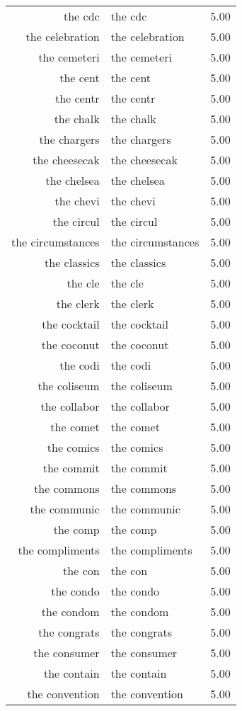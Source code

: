 \begin{table}[ht]
\begin{tabular}{rlr}
  the cdc & the cdc & 5.00 \\ 
  the celebration & the celebration & 5.00 \\ 
  the cemeteri & the cemeteri & 5.00 \\ 
  the cent & the cent & 5.00 \\ 
  the centr & the centr & 5.00 \\ 
  the chalk & the chalk & 5.00 \\ 
  the chargers & the chargers & 5.00 \\ 
  the cheesecak & the cheesecak & 5.00 \\ 
  the chelsea & the chelsea & 5.00 \\ 
  the chevi & the chevi & 5.00 \\ 
  the circul & the circul & 5.00 \\ 
  the circumstances & the circumstances & 5.00 \\ 
  the classics & the classics & 5.00 \\ 
  the cle & the cle & 5.00 \\ 
  the clerk & the clerk & 5.00 \\ 
  the cocktail & the cocktail & 5.00 \\ 
  the coconut & the coconut & 5.00 \\ 
  the codi & the codi & 5.00 \\ 
  the coliseum & the coliseum & 5.00 \\ 
  the collabor & the collabor & 5.00 \\ 
  the comet & the comet & 5.00 \\ 
  the comics & the comics & 5.00 \\ 
  the commit & the commit & 5.00 \\ 
  the commons & the commons & 5.00 \\ 
  the communic & the communic & 5.00 \\ 
  the comp & the comp & 5.00 \\ 
  the compliments & the compliments & 5.00 \\ 
  the con & the con & 5.00 \\ 
  the condo & the condo & 5.00 \\ 
  the condom & the condom & 5.00 \\ 
  the congrats & the congrats & 5.00 \\ 
  the consumer & the consumer & 5.00 \\ 
  the contain & the contain & 5.00 \\ 
  the convention & the convention & 5.00 \\ 

\end{tabular}
\end{table}
